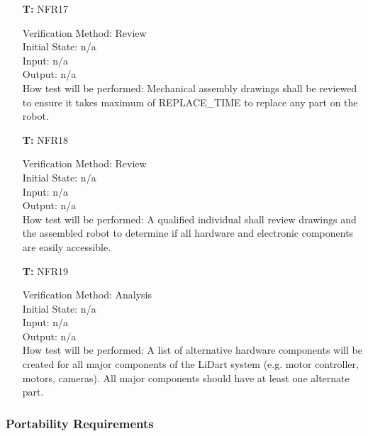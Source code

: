 \documentclass[12pt, titlepage]{article}
\newcounter{tnum} %
\begin{document}
\begin{itemize}

\item[\textbf{T\refstepcounter{tnum}\thetnum:}]{NFR17\\}

Verification Method: Review\\					
Initial State: 	n/a \\
Input: n/a\\
Output: n/a\\
How test will be performed: Mechanical assembly drawings shall be reviewed to ensure it takes maximum of REPLACE\_TIME to replace any part on the robot.


\item[\textbf{T\refstepcounter{tnum}\thetnum:}]{NFR18\\}

Verification Method: Review\\					
Initial State: 	n/a \\
Input: n/a\\
Output: n/a\\
How test will be performed: A qualified individual shall review drawings and the assembled robot to determine if all hardware and electronic components are easily accessible. \\

\item[\textbf{T\refstepcounter{tnum}\thetnum:}]{NFR19\\}

Verification Method: Analysis\\					
Initial State: 	n/a \\
Input: n/a\\
Output: n/a\\
How test will be performed: A list of alternative hardware components will be created for all major components of the LiDart system (e.g. motor controller, motors, cameras). All major components should have at least one alternate part.\\

\end{itemize}

\subsubsection{Portability Requirements}
\end{document}

